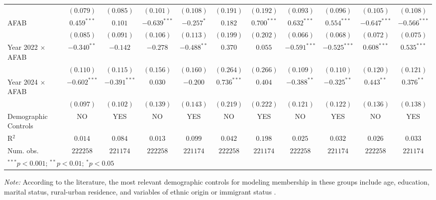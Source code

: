 \begin{table}[htpb]
{\begin{tabular}{l c c c c c c c c c c}
                        & $(0.079)$      & $(0.085)$      & $(0.101)$      & $(0.108)$     & $(0.191)$     & $(0.192)$     & $(0.093)$      & $(0.096)$      & $(0.105)$      & $(0.108)$      \\
AFAB                    & $0.459^{***}$  & $0.101$        & $-0.639^{***}$ & $-0.257^{*}$  & $0.182$       & $0.700^{***}$ & $0.632^{***}$  & $0.554^{***}$  & $-0.647^{***}$ & $-0.566^{***}$ \\
                        & $(0.085)$      & $(0.091)$      & $(0.106)$      & $(0.113)$     & $(0.199)$     & $(0.202)$     & $(0.066)$      & $(0.068)$      & $(0.072)$      & $(0.075)$      \\
Year 2022 $\times$ AFAB & $-0.340^{**}$  & $-0.142$       & $-0.278$       & $-0.488^{**}$ & $0.370$       & $0.055$       & $-0.591^{***}$ & $-0.525^{***}$ & $0.608^{***}$  & $0.535^{***}$  \\
                        & $(0.110)$      & $(0.115)$      & $(0.156)$      & $(0.160)$     & $(0.264)$     & $(0.266)$     & $(0.109)$      & $(0.110)$      & $(0.120)$      & $(0.121)$      \\
Year 2024 $\times$ AFAB & $-0.602^{***}$ & $-0.391^{***}$ & $0.030$        & $-0.200$      & $0.736^{***}$ & $0.404$       & $-0.388^{**}$  & $-0.325^{**}$  & $0.443^{**}$   & $0.376^{**}$   \\
                        & $(0.097)$      & $(0.102)$      & $(0.139)$      & $(0.143)$     & $(0.219)$     & $(0.222)$     & $(0.121)$      & $(0.122)$      & $(0.136)$      & $(0.138)$      \\
\hline
Demographic Controls    & NO             & YES            & NO             & YES           & NO            & YES           & NO             & YES            & NO             & YES            \\
R$^2$                   & $0.014$        & $0.084$        & $0.013$        & $0.099$       & $0.042$       & $0.198$       & $0.025$        & $0.032$        & $0.026$        & $0.033$        \\
Num. obs.               & $222258$       & $221174$       & $222258$       & $221174$      & $222258$      & $221174$      & $222258$       & $221174$       & $222258$       & $221174$       \\
\hline
\multicolumn{11}{l}{\scriptsize{$^{***}p<0.001$; $^{**}p<0.01$; $^{*}p<0.05$}}
\hline
\multicolumn{11}{l}{\scriptsize{$^{***}p<0.001$; $^{**}p<0.01$; $^{*}p<0.05$}} \\
\end{tabular}
}
\vspace{1ex}
\raggedright
\footnotesize\textit{Note:} According to the literature, the most relevant demographic controls for modeling membership in these groups include age, education, marital status, rural-urban residence, and variables of ethnic origin or immigrant status \citep{Badgettetal2021, Carpenteretal2020}.
\end{table}
